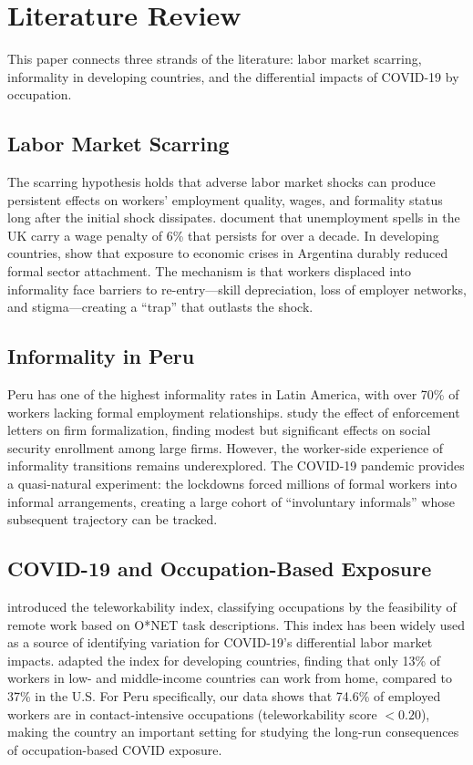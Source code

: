 \section{Literature Review}
\label{sec:literature}

This paper connects three strands of the literature: labor market scarring, informality in developing countries, and the differential impacts of COVID-19 by occupation.

\subsection{Labor Market Scarring}

The scarring hypothesis holds that adverse labor market shocks can produce persistent effects on workers' employment quality, wages, and formality status long after the initial shock dissipates. \citet{arulampalam2001} document that unemployment spells in the UK carry a wage penalty of 6\% that persists for over a decade. In developing countries, \citet{cruces2012} show that exposure to economic crises in Argentina durably reduced formal sector attachment. The mechanism is that workers displaced into informality face barriers to re-entry---skill depreciation, loss of employer networks, and stigma---creating a ``trap'' that outlasts the shock.

\subsection{Informality in Peru}

Peru has one of the highest informality rates in Latin America, with over 70\% of workers lacking formal employment relationships. \citet{bosch2025} study the effect of enforcement letters on firm formalization, finding modest but significant effects on social security enrollment among large firms. However, the worker-side experience of informality transitions remains underexplored. The COVID-19 pandemic provides a quasi-natural experiment: the lockdowns forced millions of formal workers into informal arrangements, creating a large cohort of ``involuntary informals'' whose subsequent trajectory can be tracked.

\subsection{COVID-19 and Occupation-Based Exposure}

\citet{dingel2020} introduced the teleworkability index, classifying occupations by the feasibility of remote work based on O*NET task descriptions. This index has been widely used as a source of identifying variation for COVID-19's differential labor market impacts. \citet{saltiel2020} adapted the index for developing countries, finding that only 13\% of workers in low- and middle-income countries can work from home, compared to 37\% in the U.S. For Peru specifically, our data shows that 74.6\% of employed workers are in contact-intensive occupations (teleworkability score $< 0.20$), making the country an important setting for studying the long-run consequences of occupation-based COVID exposure.

